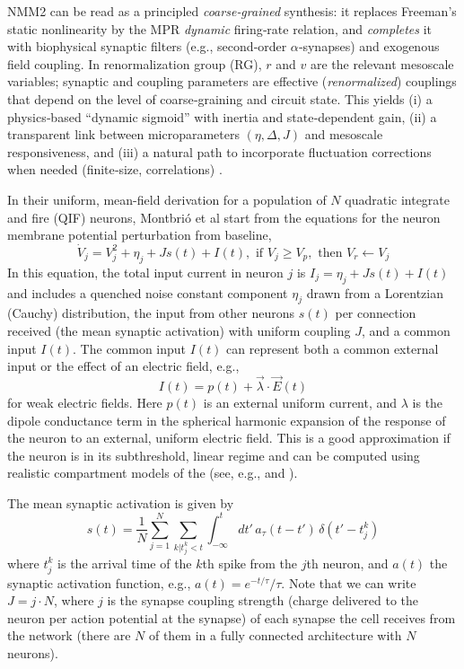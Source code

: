 \documentclass[11pt]{article}
\numberwithin{equation}{section}
\begin{document}
 
NMM2 can be read as a principled \emph{coarse‑grained} synthesis: it replaces Freeman’s static nonlinearity by the MPR \emph{dynamic} firing‑rate relation, and \emph{completes} it with biophysical synaptic filters (e.g., second‑order $\alpha$‑synapses) and exogenous field coupling. In renormalization group (RG), $r$ and $v$ are the relevant mesoscale variables; synaptic and coupling parameters are effective (\emph{renormalized}) couplings that depend on the level of coarse‑graining and circuit state. This yields (i) a physics‑based “dynamic sigmoid” with inertia and state‑dependent gain, (ii) a transparent link between microparameters $(\eta,\Delta,J)$ and mesoscale responsiveness, and (iii) a natural path to incorporate fluctuation corrections when needed (finite‑size, correlations) \cite{buiceSystematicFluctuationExpansion2010}.  %


In their uniform,  mean-field derivation for a population of $N$  quadratic integrate and fire (QIF) neurons, Montbri\'o et al \cite{Montbrio:2015aa}  start from the equations  for the neuron membrane potential perturbation from baseline,
\begin{equation} \label{eq:qif}
\dot V_j = V_j^2 + \eta_j + J s(t) + I(t), \mbox{ if } V_j \ge V_p, \mbox{ then } V_r \leftarrow V_j
\end{equation}
In this equation, the total input current in neuron $j$ is  $I_j =  \eta_j + J s(t) + I(t)$ and includes a quenched noise constant component $\eta_j$ drawn from a Lorentzian (Cauchy) distribution, the input from other neurons $s(t)$ per connection received (the mean synaptic activation) with uniform coupling $J$, and a common input $I(t)$. The common input $I(t)$ can  represent both a common external input or the effect of an electric field, e.g.,
\begin{equation}
 I(t) =  p(t) + \vec \lambda \cdot \vec E(t)   
\end{equation}
for weak electric fields.
Here $p(t)$ is an external uniform current, and $\lambda$ is the dipole conductance term in the spherical harmonic expansion of the response of the neuron to an external, uniform electric field.   This is a good approximation if the neuron is in its subthreshold, linear regime and can be computed using realistic compartment models of the  (see, e.g., \cite{aberra_biophysically_2018} and \cite{Galan:2021aa}). 

The mean synaptic activation is given by
\begin{equation}
    s(t) = \frac{1}{N}\sum_{j=1}^N \sum_{k | t^k_j < t} \int_{-\infty}^t dt' \, a_\tau(t-t') \, \delta(t'-t^k_j)
\end{equation}
where  $t^k_j$ is  the arrival time of the $k$th spike from the $j$th neuron, and  $a(t)$ the synaptic activation function, e.g., $a(t) = e^{-t/\tau}/\tau$.  Note that we can write $J=j\cdot N$, where $j$ is the synapse coupling strength (charge delivered to the neuron per action potential at the synapse) of each synapse the cell receives from the network (there are $N$ of them in a fully connected architecture with $N$ neurons). 
\end{document}
